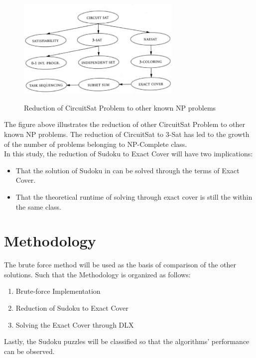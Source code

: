 \documentclass[a4paper,oneside,11pt]{report}
\begin{document}
\begin{figure}
  \centering
  {\includegraphics[width=0.7\textwidth]{circuitsat.jpg}}
  \caption{Reduction of CircuitSat Problem to other known NP problems}
\end{figure}
The figure above illustrates the reduction of other CircuitSat Problem to other known NP problems. The reduction of CircuitSat to 3-Sat has led to the growth of the number of problems belonging to NP-Complete class.\\

\noindent In this study, the reduction of Sudoku to Exact Cover will have two implications:
\begin{itemize}
\item That the solution of Sudoku in can be solved through the terms of Exact Cover.
\item That the theoretical runtime of solving through exact cover is still the within the same class.
\end{itemize}

\chapter{Methodology}
The brute force method will be used as the basis of comparison of the other solutions. Such that the Methodology is organized as follows:
\begin{enumerate}
\item Brute-force Implementation
\vspace{-0.5cm}
\item Reduction of Sudoku to Exact Cover
\vspace{-0.5cm}
\item Solving the Exact Cover through DLX
\end{enumerate}
Lastly, the Sudoku puzzles will be classified so that the algorithms’ performance can be observed.\\
\end{document}
